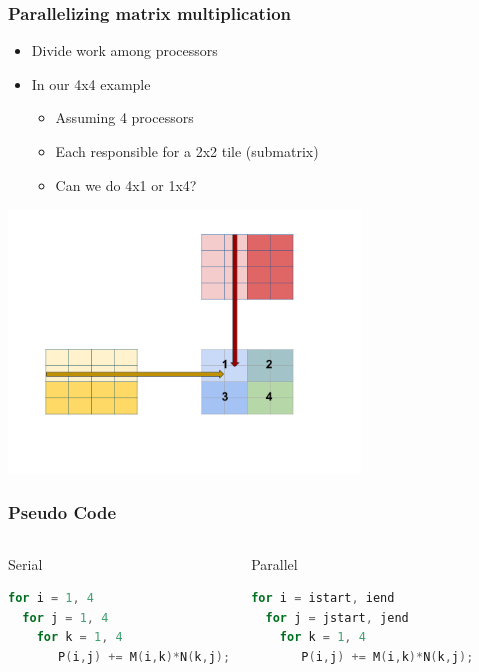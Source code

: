 \documentclass[10pt,t]{beamer}
\begin{document}
\begin{frame}
\frametitle{Parallelizing matrix multiplication}
\begin{itemize}
\item Divide work among processors
\item In our 4x4 example
\begin{itemize}
\item Assuming 4 processors
\item Each responsible for a 2x2 tile (submatrix)
\item Can we do 4x1 or 1x4?
\end{itemize}
\end{itemize}
\begin{center}
\includegraphics[width=0.7\textwidth]{./ParMatMul}
\end{center}
\end{frame}

\begin{frame}[fragile]
\frametitle{Pseudo Code}
\begin{columns}
\begin{exampleblock}{Serial}
\begin{lstlisting}[language=C]
for i = 1, 4
  for j = 1, 4
    for k = 1, 4
       P(i,j) += M(i,k)*N(k,j);
\end{lstlisting}
\end{exampleblock}
\begin{exampleblock}{Parallel}
\begin{lstlisting}[language=C]
for i = istart, iend
  for j = jstart, jend
    for k = 1, 4
       P(i,j) += M(i,k)*N(k,j);
\end{lstlisting}
\end{exampleblock}
\end{columns}
\end{frame}
\end{document}
